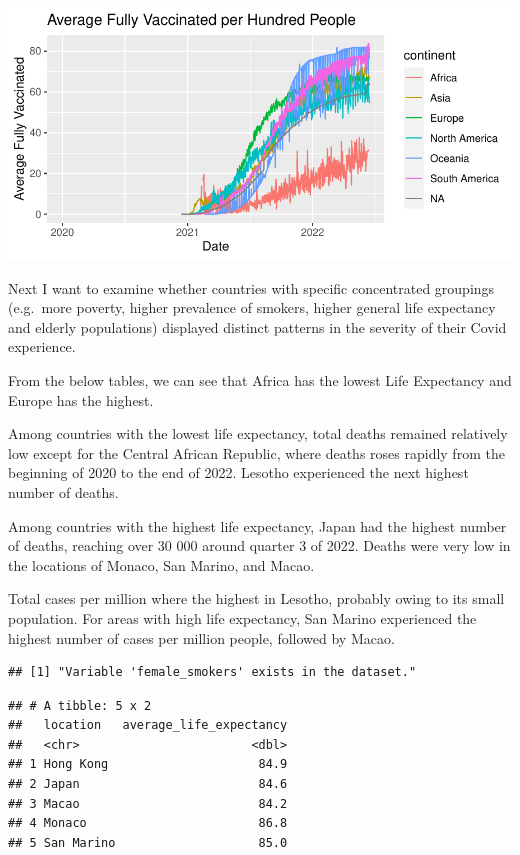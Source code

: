 \documentclass[11pt,preprint, authoryear]{elsarticle}
\let\origfigure\figure
\let\endorigfigure\endfigure
\renewenvironment{figure}[1][2] {
    \expandafter\origfigure\expandafter[H]
} {
    \endorigfigure
}
\numberwithin{equation}{section}
\numberwithin{figure}{section}
\numberwithin{table}{section}
\begin{document}
\begin{figure}[H]

{\centering \includegraphics{Q1_files/figure-latex/Figure1-3} 

}

\caption{Caption Here \label{Figure1}}\label{fig:Figure1-3}
\end{figure}

Next I want to examine whether countries with specific concentrated
groupings (e.g.~more poverty, higher prevalence of smokers, higher
general life expectancy and elderly populations) displayed distinct
patterns in the severity of their Covid experience.

From the below tables, we can see that Africa has the lowest Life
Expectancy and Europe has the highest.

Among countries with the lowest life expectancy, total deaths remained
relatively low except for the Central African Republic, where deaths
roses rapidly from the beginning of 2020 to the end of 2022. Lesotho
experienced the next highest number of deaths.

Among countries with the highest life expectancy, Japan had the highest
number of deaths, reaching over 30 000 around quarter 3 of 2022. Deaths
were very low in the locations of Monaco, San Marino, and Macao.

Total cases per million where the highest in Lesotho, probably owing to
its small population. For areas with high life expectancy, San Marino
experienced the highest number of cases per million people, followed by
Macao.

\begin{verbatim}
## [1] "Variable 'female_smokers' exists in the dataset."
\end{verbatim}

\begin{verbatim}
## # A tibble: 5 x 2
##   location   average_life_expectancy
##   <chr>                        <dbl>
## 1 Hong Kong                     84.9
## 2 Japan                         84.6
## 3 Macao                         84.2
## 4 Monaco                        86.8
## 5 San Marino                    85.0
\end{verbatim}
\end{document}
